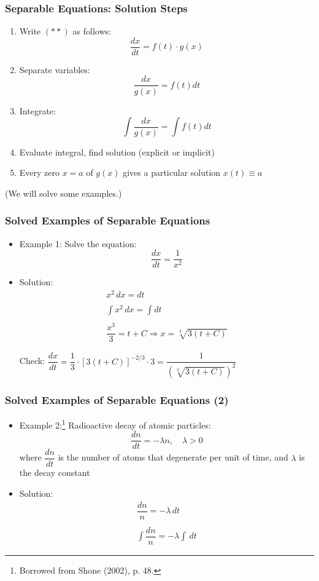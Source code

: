\documentclass[10pt,usenames,dvipsnames]{beamer}
\theoremstyle{definition}
\begin{document}
\begin{frame}[fragile]
\frametitle{Separable Equations: Solution Steps}
\begin{enumerate}
	\item Write $(**)$ as follows:
	\[
		\dfrac{dx}{dt} = f(t)\cdot g(x)
	\]
	\item Separate variables:
	\[
		\dfrac{dx}{g(x)} = f(t)dt
	\]
	\item Integrate:
	\[
		\int \dfrac{dx}{g(x)} = \int f(t)dt
	\]
	\item Evaluate integral, find solution (explicit or implicit)
	\item Every zero $x = a$ of $g(x)$ gives a particular solution $x(t) \equiv a$
\end{enumerate}

(We will solve some examples.)
\end{frame}

\begin{frame}[fragile]
	\frametitle{Solved Examples of Separable Equations}
	\begin{itemize}
		\item \textcolor{OliveGreen}{Example 1:} Solve the equation:
		\[
			\dfrac{dx}{dt} = \dfrac{1}{x^{2}}
		\]
		
		\color{red}
		\item Solution:
		\[
			\begin{array}{lcl}
				x^{2}\,dx = dt\\
				\quad\\
				\displaystyle \int x^{2}\,dx = \int dt\\
				\quad\\
				\dfrac{x^{3}}{3} = t + C \Rightarrow x = \sqrt[3]{3(t + C)}
			\end{array}
		\]
		
		Check: $ \dfrac{dx}{dt} = \dfrac{1}{3}\cdot[3(t + C)]^{-2/3}\cdot 3 = \dfrac{1}{\left(\sqrt[3]{3(t + C)}\right)^{2}} $
	\end{itemize}
\end{frame}

\begin{frame}[fragile]
	\frametitle{Solved Examples of Separable Equations (2)}
	\begin{itemize}
		\item \textcolor{OliveGreen}{Example 2:}\footnote{Borrowed from Shone (2002), p. 48.} Radioactive decay of atomic particles:
		\[
			\dfrac{dn}{dt} = -\lambda n,\quad \lambda > 0
		\]
		where $ \dfrac{dn}{dt} $ is the number of atoms that degenerate per unit of time, and $ \lambda $ is the decay constant 
		
		\color{red}
		\item Solution:
		\[
			\begin{array}{lcl}
				\dfrac{dn}{n} = -\lambda\, dt\\
				\quad\\
				\displaystyle \int \dfrac{dn}{n} = -\lambda\int\, dt
			\end{array}
		\]
	\end{itemize}	
\end{frame}
\end{document}
